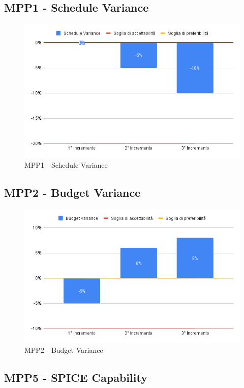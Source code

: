 \subsection{MPP1 - Schedule Variance}

\begin{figure}[H]
	\centering
	\includegraphics[scale = 0.6]{sezioni/Images/ScheduleVariance.png}
	\caption{MPP1 - Schedule Variance}
\end{figure}

\subsection{MPP2 - Budget Variance}

\begin{figure}[H]
	\centering
	\includegraphics[scale = 0.6]{sezioni/Images/BudgetVariance.png}
	\caption{MPP2 - Budget Variance}
\end{figure}

\subsection{MPP5 - SPICE Capability}

